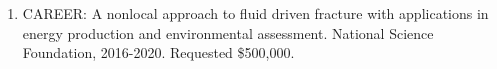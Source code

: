 \begin{enumerate}
    \item CAREER: A nonlocal approach to fluid driven fracture with applications in energy production and environmental assessment. National Science Foundation, 2016-2020. Requested \$500,000.
\end{enumerate}
